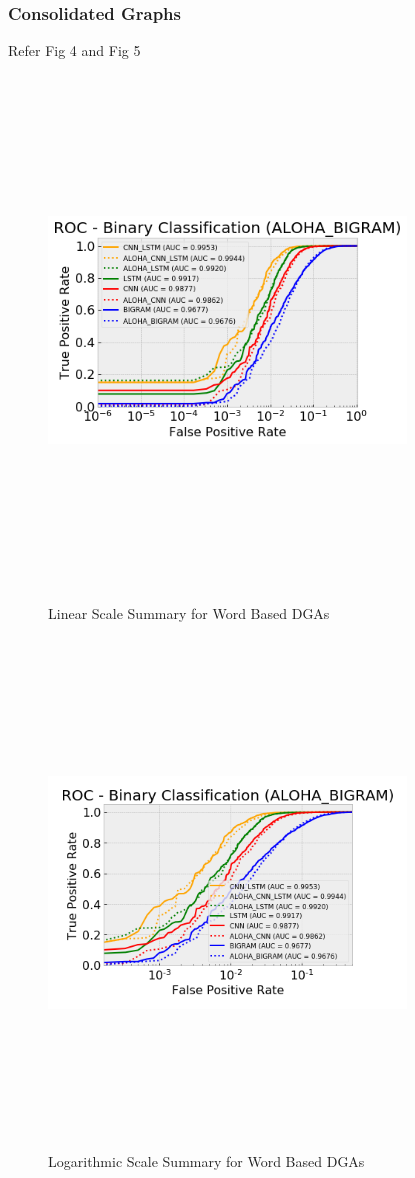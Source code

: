 \documentclass[conference]{IEEEtran}
\begin{document}
\subsubsection{Consolidated Graphs}
Refer Fig 4 and Fig 5\\
\begin{figure}[!h]
\centerline{\includegraphics[width=9.5cm,height=13.5cm,keepaspectratio]{linear_scale_word_dga.png}}
\caption{Linear Scale Summary for Word Based DGAs }
\label{fig}
\centerline{\includegraphics[width=9.5cm,height=13.5cm,keepaspectratio]{logscale_word_dga.png}}
\caption{Logarithmic Scale Summary for Word Based DGAs }
\label{fig}
\end{figure}
\end{document}
